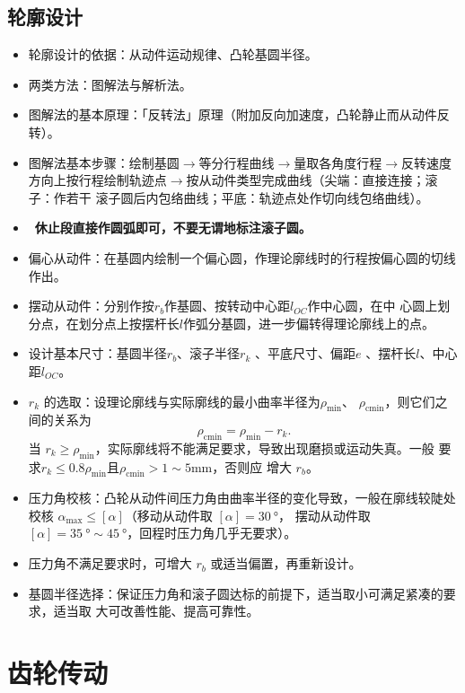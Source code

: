 \documentclass[12pt,a4paper]{article}
\newcommand{\tightlist}{\setlength{\parskip}{0pt}\setlength{\itemsep}{0pt}}
\newcommand{\hint}[1]{\textsf{（#1）}}
\newcommand{\minor}[1]{{\color{gray} #1}}
\newcommand{\then}{$\to$}
\renewcommand{\emph}[1]{\faIcon[regular]{lightbulb}\ \textbf{#1}}
\begin{document}
\subsection{轮廓设计}
\begin{itemize}\tightlist
    \item 轮廓设计的依据：从动件运动规律、凸轮基圆半径。
    \item \minor{两类方法：图解法与解析法。}
    \item 图解法的基本原理：「反转法」原理\hint{附加反向加速度，凸轮静止而从动件反转}。
    \item 图解法基本步骤：绘制基圆\then 等分行程曲线\then 量取各角度行程\then 反转速度
    方向上按行程绘制轨迹点\then 按从动件类型完成曲线\hint{尖端：直接连接；滚子：作若干
    滚子圆后内包络曲线；平底：轨迹点处作切向线包络曲线}。
    \item \emph{休止段直接作圆弧即可，不要无谓地标注滚子圆。}
    \item 偏心从动件：在基圆内绘制一个偏心圆，作理论廓线时的行程按偏心圆的切线作出。
    \item \minor{摆动从动件：分别作按$r_b$作基圆、按转动中心距$l_{OC}$作中心圆，在中
    心圆上划分点，在划分点上按摆杆长$l$作弧分基圆，进一步偏转得理论廓线上的点。}
    \item 设计基本尺寸：基圆半径$r_b$、滚子半径$r_k$\minor{、平底尺寸}、偏距$e$\minor{
    、摆杆长$l$、中心距$l_{OC}$}。
    \item $r_k$ 的选取：设理论廓线与实际廓线的最小曲率半径为$\rho_\text{min}$、
    $\rho_\text{cmin}$，则它们之间的关系为
    \[ \rho_\text{cmin}=\rho_\text{min}-r_k. \]
    当 $r_k\geq\rho_\text{min}$，实际廓线将不能满足要求，导致出现磨损或运动失真。一般
    要求$r_k\leq0.8\rho_\text{min}$且$\rho_\text{cmin}>1\sim5\text{mm}$，否则应
    增大 $r_b$。
    \item 压力角校核：凸轮从动件间压力角由曲率半径的变化导致，一般在廓线较陡处校核
    $\alpha_\text{max}\leq[\alpha]$\hint{移动从动件取 $[\alpha]=\SI{30}\degree$，
    摆动从动件取 $[\alpha]=\SI{35}\degree\sim\SI{45}\degree$，回程时压力角几乎无要求}。
    \item 压力角不满足要求时，可增大 $r_b$ 或适当偏置，再重新设计。
    \item 基圆半径选择：保证压力角和滚子圆达标的前提下，适当取小可满足紧凑的要求，适当取
    大可改善性能、提高可靠性。
\end{itemize}

\section{齿轮传动}
\end{document}
